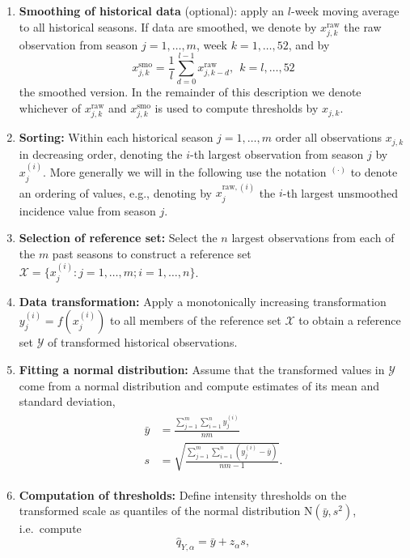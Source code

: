 \documentclass{article}
\newcommand{\sd}{s}
\begin{document}
\begin{enumerate}
\item \textbf{Smoothing of historical data} (optional): apply an $l$-week moving average to all historical seasons. If data are smoothed, we denote by $x^\text{raw}_{j, k}$ the raw observation from season $j = 1, \dots, m$, week $k = 1, \dots, 52$, and by
$$
x^\text{smo}_{j, k} = \frac{1}{l} \sum_{d = 0}^{l - 1} x^\text{raw}_{j, k - d}, \ \ k = l, \dots, 52
$$ the smoothed version. In the remainder of this description we denote whichever of $x^\text{raw}_{j, k}$ and $x^\text{smo}_{j, k}$ is used to compute thresholds by $x_{j, k}$.
\item \textbf{Sorting:} Within each historical season $j = 1, \dots, m$ order all observations $x_{j, k}$ in decreasing order, denoting the $i$-th largest observation from season $j$ by $x^{(i)}_j$. More generally we will in the following use the notation $^{(\cdot)}$ to denote an ordering of values, e.g., denoting by $x^{\text{raw}, (i)}_j$ the $i$-th largest unsmoothed incidence value from season $j$.
\item \textbf{Selection of reference set:} Select the $n$ largest observations from each of the $m$ past seasons to construct a reference set $\mathcal{X} = \{x_j^{(i)}: j = 1, \dots, m; i = 1, \dots, n\}$.
\item \textbf{Data transformation:} Apply a monotonically increasing transformation $y_j^{(i)} = f(x_j^{(i)})$ to all members of the reference set $\mathcal{X}$ to obtain a reference set $\mathcal{Y}$ of transformed historical observations.
\item \textbf{Fitting a normal distribution:} Assume that the transformed values in $\mathcal{Y}$ come from a normal distribution and compute estimates of its mean and standard deviation,
\begin{align}
\begin{split}
\bar{y} & = \frac{\sum_{j = 1}^m\sum_{i = 1}^n y_j^{(i)}}{nm}\\
\sd & = \sqrt{ \frac{\sum_{j = 1}^m\sum_{i = 1}^n (y_j^{(i)}  - \bar{y})}{nm - 1}}.
\end{split}\label{eq:moments}
\end{align}
\item \textbf{Computation of thresholds:} Define intensity thresholds on the transformed scale as quantiles of the normal distribution N$(\bar{y}, \sd^2)$, i.e.\ compute
\begin{equation}
\hat{q}_{Y, \alpha} = \bar{y} + z_\alpha \sd, \label{eq:def_q}
\end{equation}

\end{enumerate}
\end{document}
